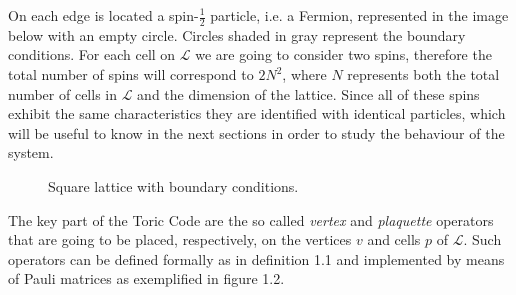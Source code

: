\documentclass{Configuration_Files/PoliMi3i_thesis}
\begin{document}
On each edge is located a spin-$\frac{1}{2}$ particle, i.e. a Fermion, represented in the image below with an empty circle. Circles shaded in gray represent the boundary conditions. 
For each cell on $\mathcal{L}$ we are going to consider two spins, therefore the total number of spins will correspond to $2N^2$, where $N$ represents both the total number of cells in $\mathcal{L}$ and the dimension of the lattice. 
Since all of these spins exhibit the same characteristics they are identified with identical particles, which will be useful to know in the next sections in order to study the behaviour of the system.

\begin{figure}[b]
	\begin{center}
	\end{center}
	
	\caption{Square lattice with boundary conditions.}
	\label{fig:lattice}
\end{figure}

\newpage
The key part of the Toric Code are the so called \textit{vertex} and \textit{plaquette} operators that are going to be placed, respectively, on the vertices $v$ and cells $p$ of $\mathcal{L}$. Such operators can be defined formally as in definition 1.1 and implemented by means of Pauli matrices as exemplified in figure 1.2. 
\end{document}
